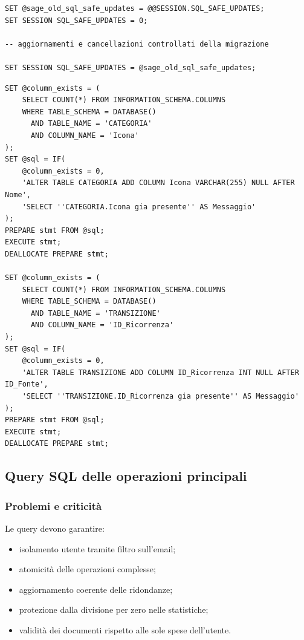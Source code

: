 \documentclass[11pt,a4paper]{article}
\begin{document}
\begin{lstlisting}[caption={Gestione della modalità safe update nella migrazione}]
SET @sage_old_sql_safe_updates = @@SESSION.SQL_SAFE_UPDATES;
SET SESSION SQL_SAFE_UPDATES = 0;

-- aggiornamenti e cancellazioni controllati della migrazione

SET SESSION SQL_SAFE_UPDATES = @sage_old_sql_safe_updates;
\end{lstlisting}

\begin{lstlisting}[caption={Migrazione condizionale delle icone e del collegamento alle ricorrenze}]
SET @column_exists = (
    SELECT COUNT(*) FROM INFORMATION_SCHEMA.COLUMNS
    WHERE TABLE_SCHEMA = DATABASE()
      AND TABLE_NAME = 'CATEGORIA'
      AND COLUMN_NAME = 'Icona'
);
SET @sql = IF(
    @column_exists = 0,
    'ALTER TABLE CATEGORIA ADD COLUMN Icona VARCHAR(255) NULL AFTER Nome',
    'SELECT ''CATEGORIA.Icona gia presente'' AS Messaggio'
);
PREPARE stmt FROM @sql;
EXECUTE stmt;
DEALLOCATE PREPARE stmt;

SET @column_exists = (
    SELECT COUNT(*) FROM INFORMATION_SCHEMA.COLUMNS
    WHERE TABLE_SCHEMA = DATABASE()
      AND TABLE_NAME = 'TRANSIZIONE'
      AND COLUMN_NAME = 'ID_Ricorrenza'
);
SET @sql = IF(
    @column_exists = 0,
    'ALTER TABLE TRANSIZIONE ADD COLUMN ID_Ricorrenza INT NULL AFTER ID_Fonte',
    'SELECT ''TRANSIZIONE.ID_Ricorrenza gia presente'' AS Messaggio'
);
PREPARE stmt FROM @sql;
EXECUTE stmt;
DEALLOCATE PREPARE stmt;
\end{lstlisting}

\subsection{Query SQL delle operazioni principali}
\subsubsection{Problemi e criticità}
Le query devono garantire:
\begin{itemize}
    \item isolamento utente tramite filtro sull'email;
    \item atomicità delle operazioni complesse;
    \item aggiornamento coerente delle ridondanze;
    \item protezione dalla divisione per zero nelle statistiche;
    \item validità dei documenti rispetto alle sole spese dell'utente.
\end{itemize}
\end{document}
